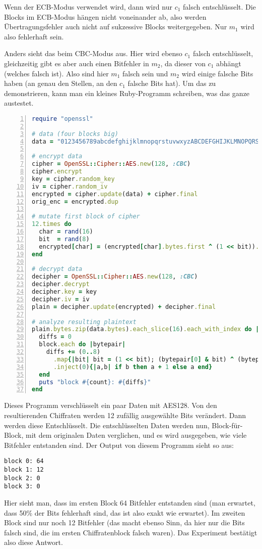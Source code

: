 \documentclass[
  ngerman,
  DIV=12
]{scrartcl}
\begin{document}
\medskip\noindent
Wenn der ECB-Modus verwendet wird, dann wird nur $c_1$ falsch entschlüsselt. Die Blocks im ECB-Modus hängen nicht voneinander ab, also werden Übertragungsfehler auch nicht auf sukzessive Blocks weitergegeben. Nur $m_1$ wird also fehlerhaft sein. 

Anders sieht das beim CBC-Modus aus. Hier wird ebenso $c_1$ falsch entschlüsselt,  gleichzeitig gibt es aber auch einen Bitfehler in $m_2$, da dieser von $c_1$ abhängt (welches falsch ist). Also sind hier $m_1$ falsch sein und $m_2$ wird einige falsche Bits haben (an genau den Stellen, an den $c_1$ falsche Bits hat).
Um das zu demonstrieren, kann man ein kleines Ruby-Programm schreiben, was das ganze austestet. 
\begin{lstlisting}[language=ruby,numbers=left]
require "openssl"

# data (four blocks big)
data = "0123456789abcdefghijklmnopqrstuvwxyzABCDEFGHIJKLMNOPQRSTUVWXYZ;"

# encrypt data
cipher = OpenSSL::Cipher::AES.new(128, :CBC)
cipher.encrypt
key = cipher.random_key
iv = cipher.random_iv
encrypted = cipher.update(data) + cipher.final
orig_enc = encrypted.dup

# mutate first block of cipher
12.times do
  char = rand(16)
  bit  = rand(8)
  encrypted[char] = (encrypted[char].bytes.first ^ (1 << bit)).chr
end

# decrypt data
decipher = OpenSSL::Cipher::AES.new(128, :CBC)
decipher.decrypt
decipher.key = key
decipher.iv = iv
plain = decipher.update(encrypted) + decipher.final

# analyze resulting plaintext
plain.bytes.zip(data.bytes).each_slice(16).each_with_index do |block, count|
  diffs = 0
  block.each do |bytepair|
    diffs += (0..8)
      .map{|bit| bit = (1 << bit); (bytepair[0] & bit) ^ (bytepair[1] & bit) != 0}
      .inject(0){|a,b| if b then a + 1 else a end}
  end
  puts "block #{count}: #{diffs}"
end  
\end{lstlisting}
Dieses Programm verschlüsselt ein paar Daten mit AES128. Von den resultierenden Chiffraten werden 12 zufällig ausgewählte Bits verändert. Dann werden diese Entschlüsselt. Die entschlüsselten Daten werden nun, Block-für-Block, mit dem originalen Daten verglichen, und es wird ausgegeben, wie viele Bitfehler entstanden sind. Der Output von diesem Programm sieht so aus:
\begin{lstlisting}
block 0: 64
block 1: 12
block 2: 0
block 3: 0  
\end{lstlisting}
Hier sieht man, dass im ersten Block 64 Bitfehler entstanden sind (man erwartet, dass 50\% der Bits fehlerhaft sind, das ist also exakt wie erwartet). Im zweiten Block sind nur noch 12 Bitfehler (das macht ebenso Sinn, da hier nur die Bits falsch sind, die im ersten Chiffratenblock falsch waren). Das Experiment bestätigt also diese Antwort.
\end{document}
